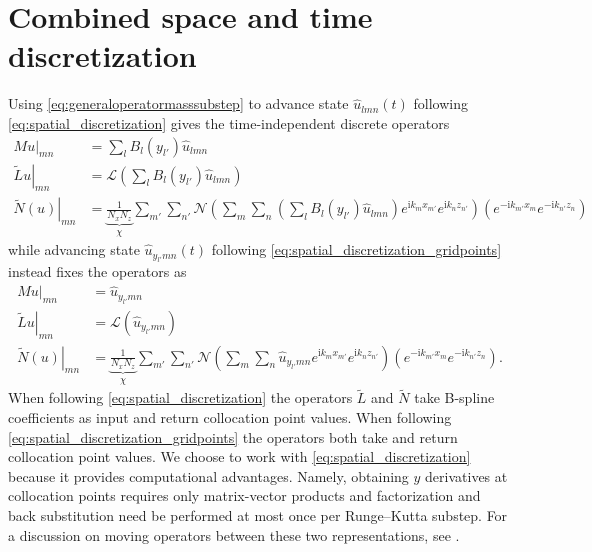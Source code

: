 \documentclass[letterpaper,11pt,nointlimits,reqno,draft]{amsbook}
\newcommand{\ii}{\ensuremath{\mathrm{i}}}
\begin{document}
\section{Combined space and time discretization}
\label{sec:combineddiscretization}

Using \eqref{eq:generaloperatormasssubstep} to advance state
$\hat{u}_{l m n}(t)$ following \eqref{eq:spatial_discretization} gives
the time-independent discrete operators
\begin{subequations}
\begin{align}
   M u\bigr|_{m n}
&= \sum_{l} B_l\!\left(y_{l'}\right)
   \hat{u}_{l m n}
\\
   \left.\tilde{L} u\right|_{m n}
&= \mathscr{L}\left(
     \sum_{l}
     B_l\!\left(y_{l'}\right)
     \hat{u}_{l m n}
   \right)
\\
   \left.\tilde{N}\!\left(u\right)\right|_{m n}
&= \underbrace{\frac{1}{N_x N_z}}_{\chi}
   \sum_{m'} \sum_{n'}
   \mathscr{N}\left(
     \sum_{m}
     \sum_{n}
     \left(
       \sum_{l} B_l\!\left(y_{l'}\right)
       \hat{u}_{l m n}
     \right)
     e^{\ii k_m x_{m'}}e^{\ii k_n z_{n'}}
   \right)
   \left(
     e^{-\ii k_{m'} x_m}e^{-\ii k_{n'} z_n}
   \right)
\end{align}
\end{subequations}
while advancing state $\hat{u}_{y_{l'} m n}(t)$ following
\eqref{eq:spatial_discretization_gridpoints} instead fixes the operators as
\begin{subequations}
\begin{align}
   M u\bigr|_{m n}
&= \hat{u}_{y_{l'} m n}
\\
   \left.\tilde{L} u\right|_{m n}
&= \mathscr{L}\left(\hat{u}_{y_{l'} m n}\right)
\\
   \left.\tilde{N}\!\left(u\right)\right|_{m n}
&= \underbrace{\frac{1}{N_x N_z}}_{\chi}
   \sum_{m'} \sum_{n'}
   \mathscr{N}\left(
     \sum_{m}
     \sum_{n}
     \hat{u}_{y_{l'} m n}
     e^{\ii k_m x_{m'}}e^{\ii k_n z_{n'}}
   \right)
   \left(
     e^{-\ii k_{m'} x_m}e^{-\ii k_{n'} z_n}
   \right)
   .
\end{align}
\end{subequations}
When following \eqref{eq:spatial_discretization} the operators $\tilde{L}$ and
$\tilde{N}$ take B-spline coefficients as input and return collocation point
values.  When following \eqref{eq:spatial_discretization_gridpoints} the
operators both take and return collocation point values.  We choose to work
with \eqref{eq:spatial_discretization} because it provides computational
advantages.  Namely, obtaining $y$ derivatives at collocation points requires
only matrix-vector products and factorization and back substitution need be
performed at most once per Runge--Kutta substep.  For a discussion on moving
operators between these two representations, see
\citet[\textsection{}5.5]{Boyd2001}.
\end{document}
